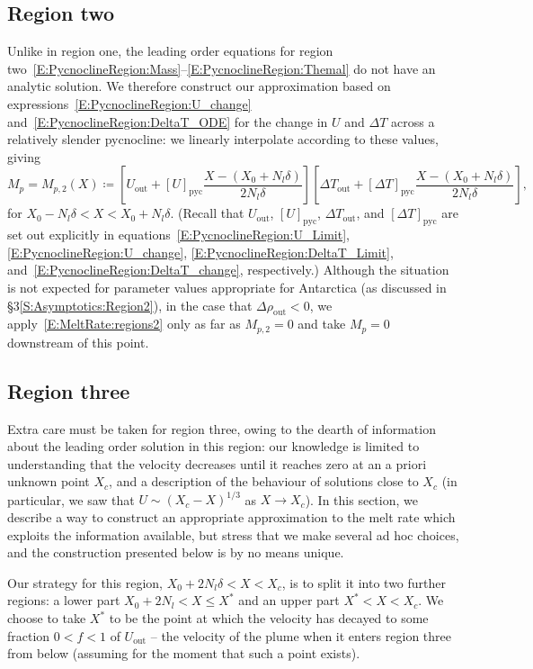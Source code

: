 \documentclass[openacc]{rsproca_new}%
\newcommand{\lt}{\delta} %
\newcommand{\out}{\text{out}}
\begin{document}
\subsection{Region two}
Unlike in region one, the leading order equations for region two~\eqref{E:PycnoclineRegion:Mass}--\eqref{E:PycnoclineRegion:Themal} do not have an analytic solution. We therefore construct our approximation based on expressions~\eqref{E:PycnoclineRegion:U_change} and~\eqref{E:PycnoclineRegion:DeltaT_ODE} for the change in $U$ and $\Delta T$ across a relatively slender pycnocline: we linearly interpolate according to these values, giving
\begin{equation}\label{E:MeltRate:regions2}
M_{p} = M_{p,2}(X) \coloneqq \left[U_{\out} + \left[U\right]_{\text{pyc}} \frac{X - (X_0 + N_l \lt)}{2N_l \lt}\right]  \left[\Delta T_{\out} +  \left[\Delta T\right]_{\text{pyc}} \frac{X - (X_0 + N_l \lt)}{2N_l \lt}\right] , 
\end{equation}
for $ X_0 - N_l \lt  < X < X_0 + N_l \lt$. (Recall that $U_\out$, $\left[U\right]_{\text{pyc}}$, $\Delta T_\out$, and $\left[\Delta T\right]_{\text{pyc}}$ are set out explicitly in equations~\eqref{E:PycnoclineRegion:U_Limit}, \eqref{E:PycnoclineRegion:U_change}, \eqref{E:PycnoclineRegion:DeltaT_Limit}, and~\eqref{E:PycnoclineRegion:DeltaT_change}, respectively.) Although the situation is not expected for parameter values appropriate for Antarctica (as discussed in \S3\ref{S:Asymptotics:Region2}), in the case that $\Delta \rho_\out < 0$, we apply~\eqref{E:MeltRate:regions2} only as far as $M_{p,2} = 0$ and take $M_{p} = 0$ downstream of this point.


\subsection{Region three}\label{S:MeltRate:R3}
Extra care must be taken for region three, owing to the dearth of information about the leading order solution in this region: our knowledge is limited to understanding that the velocity decreases until it reaches zero at an a priori unknown point $X_c$, and a description of the behaviour of solutions close to $X_c$ (in particular, we saw that $U \sim (X_c - X)^{1/3}$ as $X \to X_c$). In this section, we describe a way to construct an appropriate approximation to the melt rate which exploits the information available, but stress that we make several ad hoc choices, and the construction presented below is by no means unique.

Our strategy for this region, $X_0 + 2N_l \lt < X < X_c$, is to split it into two further regions: a lower part $X_0 + 2 N_l < X \leq X^*$ and an upper part $X^* < X < X_c$. We choose to take $X^*$ to be the point at which the velocity has decayed to some fraction $0 < f < 1$ of $U_\out$ -- the velocity of the plume when it enters region three from below (assuming for the moment that such a point exists).
\end{document}
